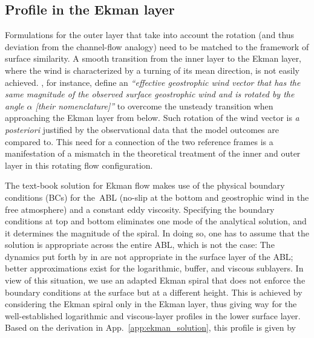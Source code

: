 \documentclass[smallcondensed,final]{svjour3}
\begin{document}
\subsection{Profile in the Ekman layer}
\label{sec:ekman}
%
Formulations for the outer layer that take into account the rotation
(and thus deviation from the channel-flow analogy)
need to be matched to the framework of surface similarity.
%
A smooth transition from the inner layer to the Ekman layer, where the wind is characterized by a turning
of its mean direction, is not easily achieved. 
%
\cite{optis:BM2014}, for instance, define an \emph{``effective geostrophic wind vector that has the same magnitude of the
observed surface geostrophic wind and is rotated by the angle $\alpha$ [their nomenclature]''} to overcome the
unsteady transition when approaching the Ekman layer from below.
%
Such rotation of the wind vector is \emph{a posteriori} justified by the observational data that the model outcomes are compared to.
%
This need for a connection of the two reference frames is a manifestation of a
mismatch in the theoretical treatment of the inner and outer layer in this rotating flow configuration. 
%
\par
%
The text-book solution for Ekman flow makes use of the physical boundary conditions (BCs) for
the~ABL (no-slip at the bottom and geostrophic wind in the free atmosphere) and a constant eddy
viscosity.
%
Specifying the boundary conditions at top and bottom eliminates one mode of the analytical solution, and
it determines the magnitude of the spiral.
%
In doing so, one has to assume that the solution is appropriate across the entire ABL, which is not the case:
The dynamics put forth by \citeauthor{ekman:AMA1905} in \citeyear{ekman:AMA1905}
are not appropriate in the surface layer of the ABL; better approximations exist for the logarithmic,
buffer, and viscous sublayers. 
%
In view of this situation, we use an adapted Ekman spiral that does not enforce the
boundary conditions at the surface but at a different height. 
%
This is achieved by considering the Ekman spiral only in the Ekman layer,
thus giving way for the well-established logarithmic and viscous-layer profiles in the
lower surface layer. 
%
Based on the derivation in App.~\ref{app:ekman_solution}, this profile is given by 
\end{document}
